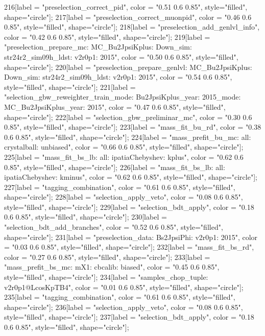 {	216[label = "preselection_correct_pid", color = "0.51 0.6 0.85", style="filled", shape="circle"];
	217[label = "preselection_correct_muonpid", color = "0.46 0.6 0.85", style="filled", shape="circle"];
	218[label = "preselection_add_genlvl_info", color = "0.42 0.6 0.85", style="filled", shape="circle"];
	219[label = "preselection_prepare_mc\nmode: MC_Bu2JpsiKplus\npolarity: Down\nstrip_sim: str24r2_sim09h_ldst\nversion: v2r0p1\nyear: 2015", color = "0.50 0.6 0.85", style="filled", shape="circle"];
	220[label = "preselection_prepare_genlvl\nmode: MC_Bu2JpsiKplus\npolarity: Down\nstrip_sim: str24r2_sim09h_ldst\nversion: v2r0p1\nyear: 2015", color = "0.54 0.6 0.85", style="filled", shape="circle"];
	221[label = "selection_gbw_reweighter_train\ndata_mode: Bu2JpsiKplus\ndata_year: 2015\nmc_mode: MC_Bu2JpsiKplus\nmc_year: 2015", color = "0.47 0.6 0.85", style="filled", shape="circle"];
	222[label = "selection_gbw_preliminar_mc", color = "0.30 0.6 0.85", style="filled", shape="circle"];
	223[label = "mass_fit_bu_rd", color = "0.38 0.6 0.85", style="filled", shape="circle"];
	224[label = "mass_prefit_bu_mc\nmassbin: all\nmassmodel: crystalball\ntrigger: unbiased", color = "0.66 0.6 0.85", style="filled", shape="circle"];
	225[label = "mass_fit_bs_lb\nmassbin: all\nmassmodel: ipatiaChebyshev\ntrigger: kplus", color = "0.62 0.6 0.85", style="filled", shape="circle"];
	226[label = "mass_fit_bs_lb\nmassbin: all\nmassmodel: ipatiaChebyshev\ntrigger: kminus", color = "0.62 0.6 0.85", style="filled", shape="circle"];
	227[label = "tagging_combination", color = "0.61 0.6 0.85", style="filled", shape="circle"];
	228[label = "selection_apply_veto", color = "0.08 0.6 0.85", style="filled", shape="circle"];
	229[label = "selection_bdt_apply", color = "0.18 0.6 0.85", style="filled", shape="circle"];
	230[label = "selection_bdt_add_branches", color = "0.52 0.6 0.85", style="filled", shape="circle"];
	231[label = "preselection_data\nmode: Bs2JpsiPhi\nversion: v2r0p1\nyear: 2015", color = "0.03 0.6 0.85", style="filled", shape="circle"];
	232[label = "mass_fit_bs_rd", color = "0.27 0.6 0.85", style="filled", shape="circle"];
	233[label = "mass_prefit_bs_mc\nmassbin: mX1\nmassmodel: cbcalib\ntrigger: biased", color = "0.45 0.6 0.85", style="filled", shape="circle"];
	234[label = "samples_chop_tuple\nversion: v2r0p1@LcosKpTB4", color = "0.01 0.6 0.85", style="filled", shape="circle"];
	235[label = "tagging_combination", color = "0.61 0.6 0.85", style="filled", shape="circle"];
	236[label = "selection_apply_veto", color = "0.08 0.6 0.85", style="filled", shape="circle"];
	237[label = "selection_bdt_apply", color = "0.18 0.6 0.85", style="filled", shape="circle"];
}
